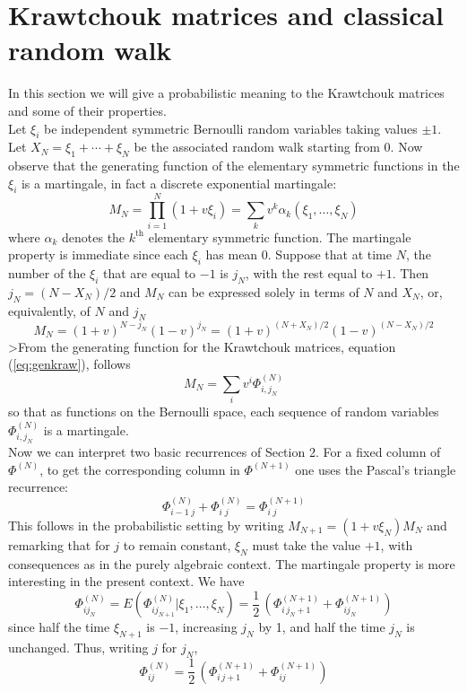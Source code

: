\documentclass[12pt]{article}    %
\def\FFF#1#2{\Phi^{(#1)}_{#2}}
\begin{document}
\section{Krawtchouk matrices and classical random walk}
\label{sec:classical}

In this section we will give a probabilistic meaning to
the Krawtchouk matrices and some of their properties.\\

Let $\xi_i$ be independent symmetric Bernoulli random variables taking
values $\pm1$. Let $X_N=\xi_1+\cdots+\xi_N$ be the associated random
walk starting from $0$. Now observe that the generating function of
the elementary symmetric functions in the $\xi_i$ is a martingale, in
fact a discrete exponential martingale:
$$
   M_N = \prod_{i=1}^N(1+v\xi_i)=\sum_k v^k 
           \alpha_k(\xi_1,\ldots,\xi_N)
$$
where $\alpha_k$ denotes the $k^{\mathrm{th}}$ elementary symmetric
function. 
The martingale property is immediate since each $\xi_i$ has mean $0$.
Suppose that at time $N$, the number of the $\xi_i$ that are equal to $-1$
is $j_N$, with the rest equal to $+1$. Then  $j_N= (N-X_N)/2$ 
and $M_N$ can be expressed solely in terms of $N$ and $X_N$, or, 
equivalently, of $N$ and $j_N$
$$
       M_N = (1+v)^{N-j_N}(1-v)^{j_N} 
           = (1+v)^{(N+X_N)/2}(1-v)^{(N-X_N)/2}  
$$
>From the generating function for the Krawtchouk
matrices, equation (\ref{eq:genkraw}), follows 
$$
    M_N = \sum_iv^i\Phi^{(N)}_{i,j_N}
$$
so that as functions on the Bernoulli space, each sequence of random
variables $\Phi^{(N)}_{i,j_N}$ is a martingale. \\

Now we can interpret two basic recurrences of Section 2. For a fixed
column of $\Phi^{(N)}$, to get the corresponding column in 
$\Phi^{(N+1)}$ one uses the Pascal's triangle recurrence:
$$
  \FFF N{i-1\;j} + \FFF N{i  \;j}  =  \FFF {N+1}{i\;j}
$$
This follows in the probabilistic setting by writing
$M_{N+1}=(1+v\xi_N)M_N$ and remarking that for $j$ to remain constant,
$\xi_N$ must take the value $+1$, with consequences as in the purely
algebraic context. The martingale property is more interesting in the
present context. We have
$$
\FFF N{ij_N}= E(\FFF N{ij_{N+1}}|\xi_1,\ldots,\xi_N)
             =\frac12\,\left(\FFF{N+1}{i\,j_N+1}+\FFF{N+1}{ij_N}\right)
$$
since half the time $\xi_{N+1}$ is $-1$, increasing $j_N$ by 1, and
half the time $j_N$ is unchanged. Thus, writing $j$ for $j_N$,
$$
      \FFF N{ij}=\frac12\,\left(\FFF{N+1}{i\,j+1}+\FFF{N+1}{ij}\right)
$$
\end{document}
